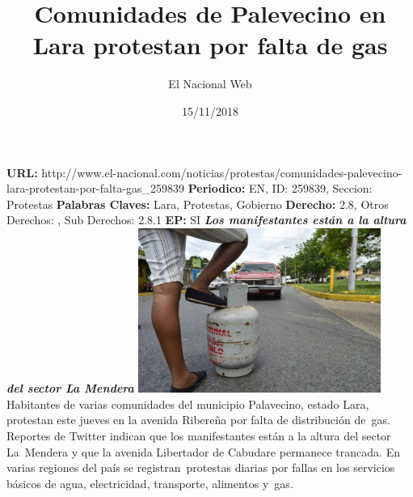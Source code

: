\documentclass{article}%
\title{\textbf{Comunidades de Palevecino en Lara protestan por falta de gas}}%
\author{El Nacional Web}%
\date{15/11/2018}%
\begin{document}
%
\normalsize%
\maketitle%
\textbf{URL: }%
http://www.el{-}nacional.com/noticias/protestas/comunidades{-}palevecino{-}lara{-}protestan{-}por{-}falta{-}gas\_259839\newline%
%
\textbf{Periodico: }%
EN, %
ID: %
259839, %
Seccion: %
Protestas\newline%
%
\textbf{Palabras Claves: }%
Lara, Protestas, Gobierno\newline%
%
\textbf{Derecho: }%
2.8, %
Otros Derechos: %
, %
Sub Derechos: %
2.8.1\newline%
%
\textbf{EP: }%
SI\newline%
\newline%
%
\textbf{\textit{Los manifestantes están a la altura del sector La Mendera}}%
\newline%
\newline%
%
\includegraphics[width=300px]{34.jpg}%
\newline%
%
Habitantes de varias comunidades del municipio Palavecino, estado Lara, protestan este jueves en la avenida Ribereña por falta de distribución de~gas.%
\newline%
%
Reportes de Twitter indican que los manifestantes están a la altura del sector La~Mendera y que la avenida Libertador de Cabudare permanece trancada.%
\newline%
%
En varias regiones del país se registran~protestas diarias por fallas en los servicios básicos de agua, electricidad, transporte, alimentos y~gas.%
\newline%
%
\end{document}
